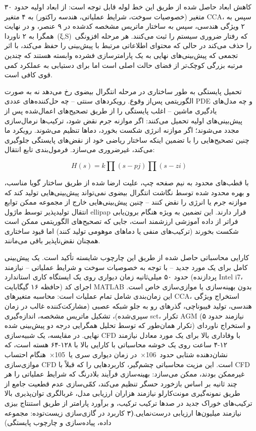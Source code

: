 \documentclass[12pt, a4paper]{article}
\begin{document}
کاهش ابعاد حاصل شده از طریق این خط لوله قابل توجه است: از ابعاد اولیه حدود ۳۰ متغیر (خصوصیات سوخت، شرایط عملیاتی، هندسه راکتور) به ۴ متغیر CCA، سپس به ۲ ویژگی هندسی، سپس به ساختار ماتریس مشخصه کدشده در ۹ عنصر، و در نهایت همگرا به ۲ ناوردا (ξ,S) که رفتار ضروری سیستم را ثبت می‌کنند. هر مرحله افزونگی را حذف می‌کند در حالی که محتوای اطلاعاتی مرتبط با پیش‌بینی را حفظ می‌کند، با اثر تجمعی که پیش‌بینی‌های نهایی به یک پارامترسازی فشرده وابسته هستند که چندین مرتبه بزرگی کوچک‌تر از فضای حالت اصلی است اما برای دستیابی به عملکرد کمی قوی کافی است.

تحمیل پایستگی به طور ساختاری در مرحله انتگرال بیضوی رخ می‌دهد نه به صورت الگوریتمی پس‌از وقوع. رویکردهای سنتی – چه حل‌کننده‌های عددی PDE و چه مدل‌های یادگیری ماشین – اغلب پایستگی را از طریق تصحیح‌های اعمال‌شده پس از پیش‌بینی‌های اولیه تحمیل می‌کنند: اگر موازنه جرم نقض شود، ترکیب‌ها نرمال‌سازی مجدد می‌شوند؛ اگر موازنه انرژی شکست بخورد، دماها تنظیم می‌شوند. رویکرد ما چنین تصحیح‌هایی را با تضمین اینکه ساختار ریاضی خود از نقض‌های پایستگی جلوگیری می‌کند، غیرضروری می‌سازد. فرمول‌بندی تابع انتقال:

\begin{equation}
H(s)=k\prod(s-pj)\prod(s-zi)
\end{equation}

با قطب‌های محدود به نیم صفحه چپ، علیت ارضا شده از طریق ساختار گویا مناسب، و بهره محدود شده توسط نگاشت انتگرال بیضوی نمی‌تواند پیش‌بینی‌هایی تولید کند که موازنه جرم یا انرژی را نقض کنند – چنین پیش‌بینی‌هایی خارج از مجموعه ممکن توابع انتقال تولیدپذیر توسط ماژول ellipap قرار دارند. این تضمین به ویژه هنگام برون‌یابی فراتر از داده آموزشی ارزشمند است، جایی که تصحیح‌های الگوریتمی ممکن است شکست بخورند (ترکیب‌های منفی یا دماهای موهومی تولید کنند) اما قیود ساختاری همچنان نقض‌ناپذیر باقی می‌مانند.

کارایی محاسباتی حاصل شده از طریق این چارچوب شایسته تأکید است. یک پیش‌بینی کامل برای یک مورد جدید – با توجه به خصوصیات سوخت و شرایط عملیاتی – نیازمند حدود ۵۰ میلی‌ثانیه زمان دیواری روی یک ایستگاه کاری استاندارد (پردازنده Intel i7، حافظه ۱۶ گیگابایت) اجرای کد MATLAB بدون بهینه‌سازی یا موازی‌سازی خاص است. این زمان‌بندی شامل تمام عملیات است: محاسبه متغیرهای CCA، استخراج ویژگی هندسی، تولید فیبوناچی، گذرهای رو به جلو شبکه عصبی (مشارکت‌کننده غالب در زمان سپری‌شده)، تشکیل ماتریس مشخصه، اندازه‌گیری sct، تکرار AGM (نیازمند حدود ۵ تکرار همان‌طور که توسط تحلیل همگرایی درجه دو پیش‌بینی شده) و استخراج ناوردای نهایی. در مقایسه، یک شبیه‌سازی CFD با وفاداری بالا برای یک مورد معادل نیازمند ۱۲-۴ ساعت روی یک خوشه محاسباتی با کارایی بالا با ۱۲۸-۶۴ هسته است، که نشان‌دهنده شتابی حدود 106× در زمان دیواری سری یا 105× هنگام احتساب موازی‌سازی CFD است. این مزیت محاسباتی چشم‌گیر، کاربردهایی را که قبلاً با CFD غیرممکن بودند، ممکن می‌سازد: بهینه‌سازی فرآیند بلادرنگ که شرایط عملیاتی را هر چند ثانیه بر اساس بازخورد حسگر تنظیم می‌کند، کمّی‌سازی عدم قطعیت جامع از طریق نمونه‌گیری مونت‌کارلو نیازمند هزاران ارزیابی مدل، غربالگری توان‌پذیری بالا ترکیب‌های خوراک جدید در صدها ترکیب ترکیب، و برآورد پارامتر از طریق استنتاج بیزی نیازمند میلیون‌ها ارزیابی درست‌نمایی.\textbf(۳ کاربرد در گازی‌سازی زیست‌توده: مجموعه داده، پیاده‌سازی و چارچوب پایستگی)
\end{document}
